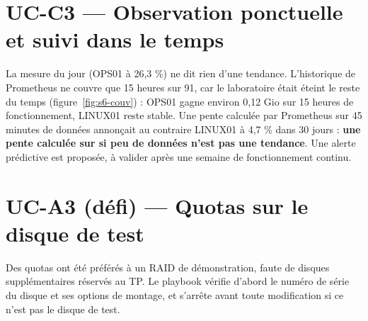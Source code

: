 


\section{UC-C3 — Observation ponctuelle et suivi dans le temps}

La mesure du jour (OPS01 \code{/} à 26,3 \%) ne dit rien d'une tendance. L'historique de Prometheus
ne couvre que 15 heures sur 91, car le laboratoire était éteint le reste du temps
(figure~\ref{fig:s6-couv}) : OPS01 gagne environ 0,12 Gio sur 15 heures de fonctionnement, LINUX01
reste stable. Une pente calculée par Prometheus sur 45 minutes de données annonçait au contraire
LINUX01 à 4,7 \% dans 30 jours : \textbf{une pente calculée sur si peu de données n'est pas une
tendance}. Une alerte prédictive est proposée, à valider après une semaine de fonctionnement continu.



\section{UC-A3 (défi) — Quotas sur le disque de test}

Des quotas ont été préférés à un RAID de démonstration, faute de disques supplémentaires réservés au
TP. Le playbook  vérifie d'abord le numéro de série du disque et ses options
de montage, et s'arrête avant toute modification si ce n'est pas le disque de test.

